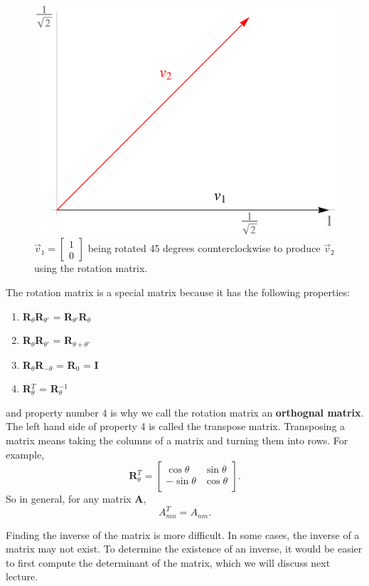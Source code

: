 \documentclass{article}
\begin{document}
\begin{figure}[H]
  \centering
  \includegraphics[scale=0.7]{Figures/rotation.png}
    \caption{$\vec{v}_1 = \begin{bmatrix} 1 \\ 0 \end{bmatrix}$ being rotated 45 degrees counterclockwise to produce $\vec{v}_2$ using the rotation matrix.}
  \label{fig:rotation}
\end{figure}
The rotation matrix is a special matrix because it has the following properties:
\begin{enumerate}
  \item \textbf{R}$_{\theta}$\textbf{R}$_{\theta'}$ = \textbf{R}$_{\theta'}$\textbf{R}$_{\theta}$
  \item \textbf{R}$_{\theta}$\textbf{R}$_{\theta'}$ = \textbf{R}$_{\theta + \theta'}$
  \item \textbf{R}$_{\theta}$\textbf{R}$_{-\theta}$ = \textbf{R}$_{0}$ = \textbf{I}
  \item \textbf{R}$_{\theta}^T$ = \textbf{R}$_{\theta}^{-1}$
\end{enumerate}
and property number 4 is why we call the rotation matrix an \textbf{orthognal matrix}.
The left hand side of property 4 is called the transpose matrix.
Transposing a matrix means taking the columns of a matrix and turning them into rows.
For example,
\begin{equation}
  \textbf{R}_{\theta}^{T} =
  \begin{bmatrix}
    \cos{\theta} & \sin{\theta}\\
    -\sin{\theta} & \cos{\theta} \\
  \end{bmatrix}.
\end{equation}
So in general, for any matrix \textbf{A},
\begin{equation}
  A_{mn}^T = A_{nm} .
\end{equation}

Finding the inverse of the matrix is more difficult.
In some cases, the inverse of a matrix may not exist.
To determine the existence of an inverse, it would be easier to first compute the determinant of the matrix, which we will discuss next lecture.
\end{document}
